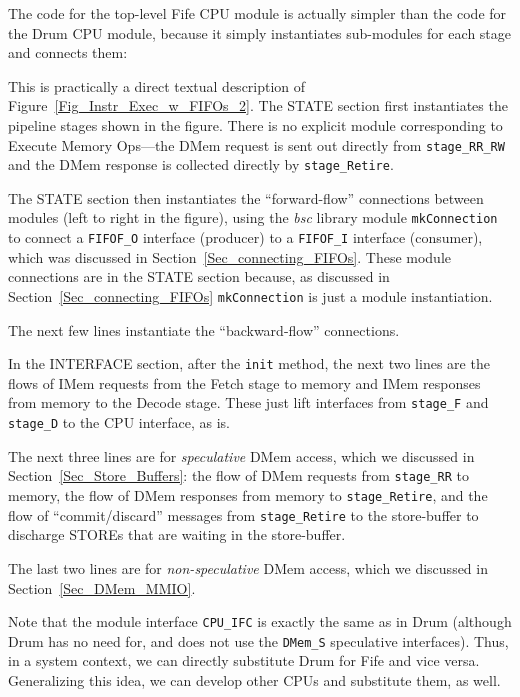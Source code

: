 \label{Sec_Fife_CPU_module}

The code for the top-level Fife CPU module is actually simpler than
the code for the Drum CPU module, because it simply instantiates
sub-modules for each stage and connects them:



This is practically a direct textual description of
Figure~\ref{Fig_Instr_Exec_w_FIFOs_2}.  The STATE section first
instantiates the pipeline stages shown in the figure.  There is no
explicit module corresponding to Execute Memory Ops---the DMem request
is sent out directly from \verb|stage_RR_RW| and the DMem response is
collected directly by \verb|stage_Retire|.

The STATE section then instantiates the ``forward-flow'' connections
between modules (left to right in the figure), using the \emph{bsc}
library module \verb|mkConnection| to connect a \verb|FIFOF_O|
interface (producer) to a \verb|FIFOF_I| interface (consumer), which
was discussed in Section~\ref{Sec_connecting_FIFOs}.  These module
connections are in the STATE section because, as discussed in
Section~\ref{Sec_connecting_FIFOs} \verb|mkConnection| is just a
module instantiation.

The next few lines instantiate the ``backward-flow'' connections.

In the INTERFACE section, after the \verb|init| method, the next two
lines are the flows of IMem requests from the Fetch stage to memory
and IMem responses from memory to the Decode stage.  These just lift
interfaces from \verb|stage_F| and \verb|stage_D| to the CPU
interface, as is.

The next three lines are for \emph{speculative} DMem access, which we
discussed in Section~\ref{Sec_Store_Buffers}: the flow of DMem
requests from \verb|stage_RR| to memory, the flow of DMem responses
from memory to \verb|stage_Retire|, and the flow of ``commit/discard''
messages from \verb|stage_Retire| to the store-buffer to discharge
STOREs that are waiting in the store-buffer.

The last two lines are for \emph{non-speculative} DMem access, which
we discussed in Section~\ref{Sec_DMem_MMIO}.

Note that the module interface \verb|CPU_IFC| is exactly the same as
in Drum (although Drum has no need for, and does not use the
\verb|DMem_S| speculative interfaces).  Thus, in a system context, we
can directly substitute Drum for Fife and vice versa.  Generalizing
this idea, we can develop other CPUs and substitute them, as well.

